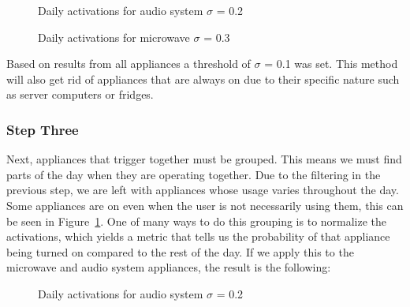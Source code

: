 \begin{figure}[H]
    \centering
    \caption{Daily activations for audio system $\sigma$ = 0.2}
    \label{arr:as_acts}
\end{figure}

\begin{figure}[H]
    \centering
    \caption{Daily activations for microwave $\sigma$ = 0.3}
    \label{arr:microwave_acts}
\end{figure}

Based on results from all appliances a threshold of $\sigma$ = 0.1 was set.
This method will also get rid of appliances that are always on due to their specific nature such as server computers 
or fridges. 

\subsubsection{Step Three}

Next, appliances that trigger together must be grouped. 
This means we must find parts of the day when they are operating together.
Due to the filtering in the previous step, we are left with appliances whose usage varies throughout the day. 
Some appliances are on even when the user is not necessarily using them, this can be seen in Figure \ref{arr:as_acts}.
One of many ways to do this grouping is to normalize the activations, which yields a metric that tells us the probability of that appliance being turned on compared to the rest of the day. 
If we apply this to the microwave and audio system appliances, the result is the following: 

\begin{figure}[H]
    \centering
    \caption{Daily activations for audio system $\sigma$ = 0.2}
    \label{arr:as_acts_norm}
\end{figure}

